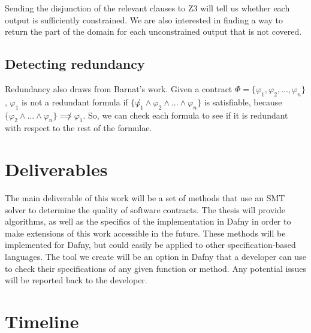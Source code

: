\documentclass{article}
\begin{document}
Sending the disjunction of the relevant clauses to Z3 will tell us whether each output is sufficiently constrained.
We are also interested in finding a way to return the part of the domain for each unconstrained output that
is not covered.

\subsection*{Detecting redundancy}

Redundancy also draws from Barnat's work. Given a contract \(\Phi = \{\varphi_{1}, \varphi_{2}, ..., \varphi_{n}\}\),
\(\varphi_{1}\) is not a redundant formula if \(\{\not \varphi_{1} \land \varphi_{2} \land ... \land \varphi_{n}\}\)
is satisfiable, because \(\{\varphi_{2} \land ... \land \varphi_{n}\} \not\implies \varphi_{1}\). So, we can check
each formula to see if it is redundant with respect to the rest of the formulae.

\section{Deliverables}

The main deliverable of this work will be a set of methods that use an SMT solver to determine the quality of software
contracts. The thesis will provide algorithms, as well as the specifics of the implementation in Dafny in order to make
extensions of this work accessible in the future. These methods will be implemented for Dafny, but could easily be
applied to other specification-based languages. The tool we create will be an option in Dafny that a developer can
use to check their specifications of any given function or method. Any potential issues will be reported back to the
developer.

\section{Timeline}

% 
% 
% 

\end{document}
